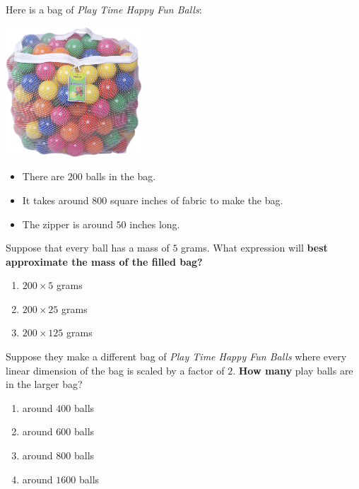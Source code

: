 \documentclass[handout,noauthor,nooutcomes]{ximera}
\author{Bart Snapp}
\begin{document}
\maketitle


Here is a bag of \textit{Play Time Happy Fun Balls}:
\begin{multicols}{2}
  \begin{center}
    \includegraphics[width=2in]{ballsInBag.jpg}
  \end{center}
  \begin{itemize}
  \item There are $200$ balls in the bag.
  \item It takes around $800$ square inches of fabric to make the bag.
  \item The zipper is around $50$ inches long.
  \end{itemize}
\end{multicols}






\begin{exercise}
  Suppose that every ball has a mass of $5$ grams.  What expression
  will \textbf{best approximate the mass of the filled bag?}
  \begin{multicols}{3}
    \begin{enumerate}
  \item $200\times5$ grams
  \item $200\times25$ grams
  \item $200\times125$ grams
    \end{enumerate}
  \end{multicols}
\end{exercise}



\begin{exercise}
  Suppose they make a different bag of \textit{Play Time Happy Fun
    Balls} where every linear dimension of the bag is scaled by a
  factor of $2$.  \textbf{How many} play balls are in the larger bag?
  \begin{multicols}{4}
    \begin{enumerate}
  \item around $400$ balls
  \item around $600$ balls
  \item around $800$ balls
  \item around $1600$ balls
    \end{enumerate}
  \end{multicols}
\end{exercise}
\end{document}
